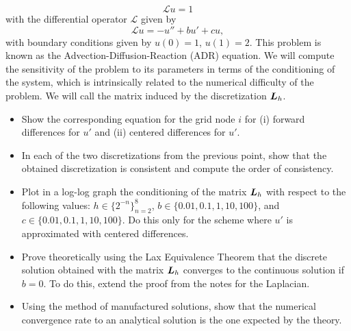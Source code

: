 \documentclass{article}
\newcommand{\mat}{\matrixsym}
\begin{document}
\begin{enumerate}
            $$ \mathcal L u = 1 $$ 
            with the differential operator $\mathcal L$ given by
            $$ \mathcal L u = - u'' + bu' + cu, $$
            with boundary conditions given by $u(0) = 1$, $u(1) = 2$. This problem is known as the Advection-Diffusion-Reaction (ADR) equation. We will compute the sensitivity of the problem to its parameters in terms of the conditioning of the system, which is intrinsically related to the numerical difficulty of the problem. We will call the matrix induced by the discretization $\mat L_h$. 
            \begin{itemize}
                \item{} Show the corresponding equation for the grid node $i$ for (i) forward differences for $u'$ and (ii) centered differences for $u'$. 
                \item{} In each of the two discretizations from the previous point, show that the obtained discretization is consistent and compute the order of consistency.
                \item{} Plot in a log-log graph the conditioning of the matrix $\mat L_h$ with respect to the following values: $h \in \{2^{-n}\}_{n=2}^8$, $b \in \{0.01,0.1,1,10,100\}$, and $c \in \{0.01,0.1,1,10,100\}$. Do this only for the scheme where $u'$ is approximated with centered differences.
                \item{} Prove theoretically using the Lax Equivalence Theorem that the discrete solution obtained with the matrix $\mat L_h$ converges to the continuous solution if $b=0$. To do this, extend the proof from the notes for the Laplacian.
                \item{} Using the method of manufactured solutions, show that the numerical convergence rate to an analytical solution is the one expected by the theory. 
            \end{itemize}

\end{enumerate}

\end{document}

